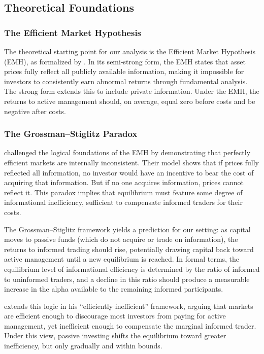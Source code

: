\documentclass[11pt, a4paper]{article}
\begin{document}
\subsection{Theoretical Foundations}

\subsubsection{The Efficient Market Hypothesis}

The theoretical starting point for our analysis is the Efficient Market Hypothesis (EMH), as formalized by \textcite{fama1970}. In its semi-strong form, the EMH states that asset prices fully reflect all publicly available information, making it impossible for investors to consistently earn abnormal returns through fundamental analysis. The strong form extends this to include private information. Under the EMH, the returns to active management should, on average, equal zero before costs and be negative after costs.

\subsubsection{The Grossman--Stiglitz Paradox}

\textcite{grossman1980} challenged the logical foundations of the EMH by demonstrating that perfectly efficient markets are internally inconsistent. Their model shows that if prices fully reflected all information, no investor would have an incentive to bear the cost of acquiring that information. But if no one acquires information, prices cannot reflect it. This paradox implies that equilibrium must feature some degree of informational inefficiency, sufficient to compensate informed traders for their costs.

The Grossman--Stiglitz framework yields a prediction for our setting: as capital moves to passive funds (which do not acquire or trade on information), the returns to informed trading should rise, potentially drawing capital back toward active management until a new equilibrium is reached. In formal terms, the equilibrium level of informational efficiency is determined by the ratio of informed to uninformed traders, and a decline in this ratio should produce a measurable increase in the alpha available to the remaining informed participants.

\textcite{pedersen2015} extends this logic in his ``efficiently inefficient'' framework, arguing that markets are efficient enough to discourage most investors from paying for active management, yet inefficient enough to compensate the marginal informed trader. Under this view, passive investing shifts the equilibrium toward greater inefficiency, but only gradually and within bounds.
\end{document}
